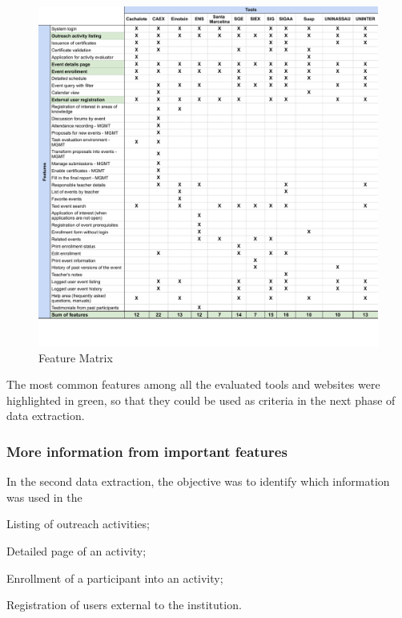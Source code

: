 \begin{figure}[htb]
  \caption{Feature Matrix}\label{fig:gl-matrix}
  \begin{center}
    \includegraphics[width=16cm]{img/functionality-matrix.pdf}
  \end{center}
\end{figure}

The most common features among all the evaluated tools and websites were highlighted in green, so that they could be used as criteria in the next phase of data extraction.

\subsubsection{More information from important features}\label{sec:gl-data-extraction-2}

In the second data extraction, the objective was to identify which information was used in the
\begin{inparaenum}[(i)]
  \item Listing of outreach activities;
  \item Detailed page of an activity;
  \item Enrollment of a participant into an activity;
  \item Registration of users external to the institution.
\end{inparaenum}

